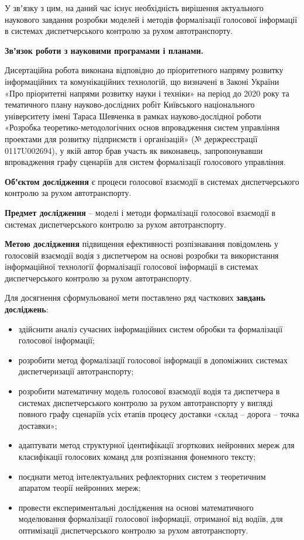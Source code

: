 У звʼязку з цим, на даний час існує необхідність вирішення актуального наукового завдання розробки моделей і методів формалізації голосової інформації в системах диспетчерського контролю за рухом автотранспорту.

\textbf{Звʼязок роботи з науковими програмами і планами.}

Дисертаційна робота виконана відповідно до пріоритетного напряму розвитку інформаційних та комунікаційних технологій, що визначені в Законі України «Про пріоритетні напрями розвитку науки і техніки» на період до 2020 року та тематичного плану науково-дослідних робіт Київського національного університету імені Тараса Шевченка в рамках науково-дослідної роботи «Розробка теоретико-методологічних основ впровадження систем управління проектами для розвитку підприємств і організацій» (№ держреєстрації 0117U002694), у якій автор брав участь як виконавець, запропонувавши впровадження графу сценаріїв для систем формалізації голосового управління.

\textbf{Обʼєктом дослідження} є процеси голосової взаємодії в системах диспетчерського контролю за рухом автотранспорту.

\textbf{Предмет дослідження} – моделі і методи формалізації голосової взаємодії в системах диспетчерського контролю за рухом автотранспорту.

\textbf{Метою дослідження} підвищення ефективності розпізнавання повідомлень у голосовій взаємодії водія з диспетчером на основі розробки та використання інформаційної технології формалізації голосової інформації в системах диспетчерського контролю за рухом автотранспорту.

Для досягнення сформульованої мети поставлено ряд часткових \textbf{завдань досліджень}:

\begin{itemize}
	\item здійснити аналіз сучасних інформаційних систем обробки та формалізації голосової інформації;
	\item розробити метод формалізації голосової інформації в допоміжних системах диспетчеризації автотранспорту;
	\item розробити математичну модель голосової взаємодії водія та диспетчера в системах диспетчерського контролю за рухом автотранспорту у вигляді повного графу сценаріїв усіх етапів процесу доставки «склад – дорога – точка доставки»;
	\item адаптувати метод структурної ідентифікації згорткових нейронних мереж для класифікації голосових команд для розпізнання фонемного тексту;
	\item поєднати метод інтелектуальних рефлекторних систем з теоретичним апаратом теорії нейронних мереж;
	\item провести експериментальні дослідження на основі математичного моделювання формалізації голосової інформації, отриманої від водіїв, для оптимізації диспетчерського контролю за рухом автотранспорту.
\end{itemize}

